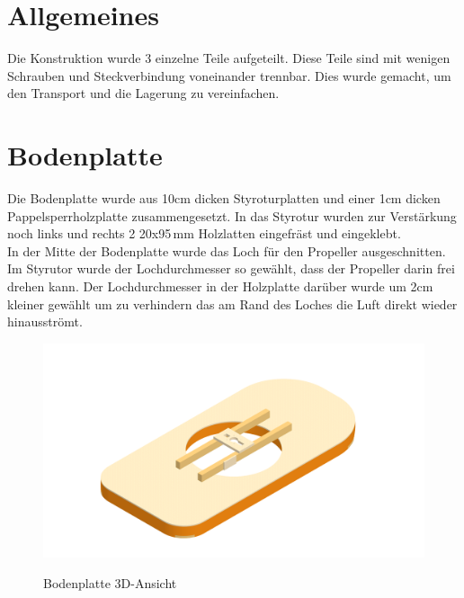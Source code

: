 \section{Allgemeines}
Die Konstruktion wurde 3 einzelne Teile aufgeteilt. Diese Teile sind mit wenigen Schrauben und Steckverbindung voneinander trennbar. Dies wurde gemacht, um den Transport und die Lagerung zu vereinfachen.


\newpage
\section{Bodenplatte}
Die Bodenplatte wurde aus 10cm dicken Styroturplatten und einer 1cm dicken Pappelsperrholzplatte zusammengesetzt. In das Styrotur wurden zur Verstärkung noch links und rechts 2 20x95\,mm Holzlatten eingefräst und eingeklebt.\\
In der Mitte der Bodenplatte wurde das Loch für den Propeller ausgeschnitten. Im Styrutor wurde der Lochdurchmesser so gewählt, dass der Propeller darin frei drehen kann. Der Lochdurchmesser in der Holzplatte darüber wurde um 2cm kleiner gewählt um zu verhindern das am Rand des Loches die Luft direkt wieder hinausströmt.

\begin{figure}[H]
    \centering
    \includegraphics[width=\textwidth]{../../../../Inventor/Bodenplatte/Bodenplatte.png}
    \label{fig:konst:bodenplatte:gesamt}
    \caption{Bodenplatte 3D-Ansicht}
\end{figure}

